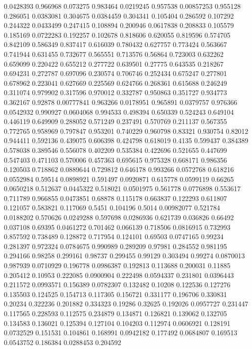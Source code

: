 0.0428393 0.966968
0.073275 0.983464
0.0219245 0.957538
0.00857253 0.955128
0.286051 0.0383081
0.304675 0.0384459
0.304341 0.105404
0.286592 0.107292
0.244322 0.0433499
0.247415 0.108894
0.200946 0.0617838
0.208833 0.105579
0.185169 0.0722283
0.192257 0.102678
0.818606 0.620055
0.819596 0.574705
0.842109 0.586349
0.837417 0.616039
0.780432 0.627757
0.773424 0.563667
0.741944 0.631455
0.732677 0.565551
0.713576 0.56864
0.723003 0.632262
0.659099 0.220422
0.655212 0.277722
0.639501 0.27775
0.643535 0.218267
0.694231 0.272787
0.697096 0.230574
0.706746 0.252434
0.675247 0.277801
0.678962 0.223041
0.627669 0.225569
0.624766 0.268361
0.615688 0.246249
0.311074 0.979902
0.317596 0.970012
0.332787 0.950863
0.351727 0.934773
0.362167 0.92878
0.00777841 0.963266
0.0178951 0.965891
0.0379757 0.976366
0.0542932 0.990927
0.0604068 0.994533
0.498394 0.650339
0.524243 0.649104
0.446119 0.649909
0.288052 0.571249
0.237491 0.570769
0.211137 0.567355
0.772765 0.958969
0.797847 0.953201
0.740229 0.960798
0.83321 0.930754
0.82012 0.944411
0.592136 0.439075
0.606398 0.424798
0.618019 0.4135
0.599437 0.384389
0.578038 0.389546
0.556078 0.402209
0.535384 0.422696
0.521655 0.447699
0.547403 0.471103
0.570006 0.457363
0.695615 0.975328
0.668171 0.986356
0.120503 0.718862
0.0889644 0.729812
0.646178 0.993266
0.0572768 0.618216
0.0552984 0.59514
0.0898921 0.591497
0.0920871 0.615778
0.0599119 0.66265
0.0650218 0.512637
0.0445322 0.518021
0.0501975 0.561778
0.0776898 0.553617
0.711789 0.966855
0.0473851 0.68878
0.115178 0.663837
0.122293 0.611807
0.121057 0.583821
0.117069 0.5451
0.104196 0.5014
0.00982077 0.521784
0.0188202 0.570626
0.0249288 0.597698
0.0286936 0.621739
0.036826 0.66492
0.037108 0.69395
0.0461272 0.701462
0.066139 0.718506
0.0816915 0.732993
0.857592 0.738489
0.128872 0.717954
0.124101 0.69503
0.0747165 0.99234
0.281397 0.972324
0.0784675 0.990989
0.289209 0.97981
0.284552 0.981195
0.294166 0.98258
0.299161 0.98737
0.299455 0.99129
0.303494 0.99274
0.0870013 0.987939
0.0710929 0.196778
0.0986387 0.192813
0.113688 0.200031
0.11885 0.205412
0.10953 0.222085
0.0900904 0.222498
0.0594337 0.231801
0.0396443 0.211572
0.0993571 0.156389
0.0782307 0.132482
0.10208 0.122536
0.127276 0.135503
0.124525 0.154713
0.117305 0.156721
0.331177 0.196706
0.330831 0.20234
0.322236 0.201882
0.334323 0.19286
0.32625 0.192026
0.0957727 0.231447
0.117565 0.228593
0.112575 0.234879
0.134871 0.126821
0.139062 0.132705
0.134583 0.136021
0.125394 0.127104
0.104203 0.112974
0.0606921 0.128191
0.0732529 0.151531
0.104861 0.168991
0.0942182 0.177492
0.0684807 0.169513
0.0543752 0.186384
0.0288453 0.204592
